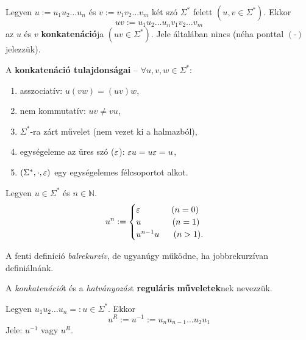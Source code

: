 \begin{tcolorbox}
	\begin{definition}[Konkatenáció]
		Legyen $u := u_1u_2\dots u_n$ és $v := v_1v_2\dots v_m$ két szó $\Sigma^*$ felett $(u, v \in \Sigma^*)$. Ekkor \[ uv := u_1u_2\dots u_n v_1v_2\dots v_m \] az $u$ és $v$ \textbf{konkatenáció}ja $(uv \in \Sigma^*)$. Jele általában nincs (néha ponttal $(\cdot)$ jelezzük).
	\end{definition}
\end{tcolorbox}

A \textbf{konkatenáció tulajdonságai} -- $\forall u, v, w \in \Sigma^*:$
\begin{enumerate}
	\item asszociatív: $u(vw) = (uv)w$,
	\item nem kommutatív: $uv \neq vu$,
	\item $\Sigma^*$-ra zárt művelet (nem vezet ki a halmazból),
	\item egységeleme az üres szó ($\varepsilon$): $\varepsilon u = u \varepsilon = u$,
	\item $(\Sigma^*, \cdot, \varepsilon )$ egy egységelemes félcsoportot alkot.
\end{enumerate}

\begin{tcolorbox}
	\begin{definition}[Hatványozás]
		Legyen $u \in \Sigma^*$ és $n \in \mathbb{N}$.
		\[ u^n := \begin{cases}
			\varepsilon ~~~~~~~~~~~ (n = 0) \\
			u ~~~~~~~~~~~ (n = 1) \\
			u^{n-1}u ~~~~~ (n > 1).
		\end{cases} \]
	\end{definition}
\end{tcolorbox}

A fenti definíció \textit{balrekurzív}, de ugyanúgy működne, ha jobbrekurzívan definiálnánk.

A \textit{konkatenáció}t és a \textit{hatványozás}t \textbf{reguláris műveletek}nek nevezzük.

\begin{tcolorbox}
	\begin{definition}[Megfordítás]
		Legyen $ u_1 u_2 \dots u_n =: u \in \Sigma^*$. Ekkor \[ u^R := u^{-1} := u_n u_{n-1} \dots u_2 u_1 \] Jele: $\boxed{u^{-1}}$ vagy $\boxed{u^R}$.
	\end{definition}
\end{tcolorbox}

